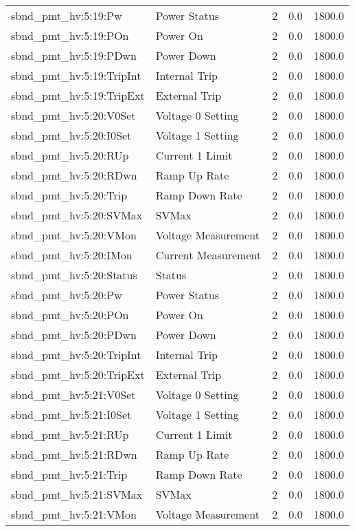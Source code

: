 \begin{center}
\begin{longtable}{l | l l l l }
sbnd\_pmt\_hv:5:19:Pw & Power Status & 2 & 0.0 & 1800.0\\ 
sbnd\_pmt\_hv:5:19:POn & Power On & 2 & 0.0 & 1800.0\\ 
sbnd\_pmt\_hv:5:19:PDwn & Power Down & 2 & 0.0 & 1800.0\\ 
sbnd\_pmt\_hv:5:19:TripInt & Internal Trip & 2 & 0.0 & 1800.0\\ 
sbnd\_pmt\_hv:5:19:TripExt & External Trip & 2 & 0.0 & 1800.0\\ 
sbnd\_pmt\_hv:5:20:V0Set & Voltage 0 Setting & 2 & 0.0 & 1800.0\\ 
sbnd\_pmt\_hv:5:20:I0Set & Voltage 1 Setting & 2 & 0.0 & 1800.0\\ 
sbnd\_pmt\_hv:5:20:RUp & Current 1 Limit & 2 & 0.0 & 1800.0\\ 
sbnd\_pmt\_hv:5:20:RDwn & Ramp Up Rate & 2 & 0.0 & 1800.0\\ 
sbnd\_pmt\_hv:5:20:Trip & Ramp Down Rate & 2 & 0.0 & 1800.0\\ 
sbnd\_pmt\_hv:5:20:SVMax & SVMax & 2 & 0.0 & 1800.0\\ 
sbnd\_pmt\_hv:5:20:VMon & Voltage Measurement & 2 & 0.0 & 1800.0\\ 
sbnd\_pmt\_hv:5:20:IMon & Current Measurement & 2 & 0.0 & 1800.0\\ 
sbnd\_pmt\_hv:5:20:Status & Status & 2 & 0.0 & 1800.0\\ 
sbnd\_pmt\_hv:5:20:Pw & Power Status & 2 & 0.0 & 1800.0\\ 
sbnd\_pmt\_hv:5:20:POn & Power On & 2 & 0.0 & 1800.0\\ 
sbnd\_pmt\_hv:5:20:PDwn & Power Down & 2 & 0.0 & 1800.0\\ 
sbnd\_pmt\_hv:5:20:TripInt & Internal Trip & 2 & 0.0 & 1800.0\\ 
sbnd\_pmt\_hv:5:20:TripExt & External Trip & 2 & 0.0 & 1800.0\\ 
sbnd\_pmt\_hv:5:21:V0Set & Voltage 0 Setting & 2 & 0.0 & 1800.0\\ 
sbnd\_pmt\_hv:5:21:I0Set & Voltage 1 Setting & 2 & 0.0 & 1800.0\\ 
sbnd\_pmt\_hv:5:21:RUp & Current 1 Limit & 2 & 0.0 & 1800.0\\ 
sbnd\_pmt\_hv:5:21:RDwn & Ramp Up Rate & 2 & 0.0 & 1800.0\\ 
sbnd\_pmt\_hv:5:21:Trip & Ramp Down Rate & 2 & 0.0 & 1800.0\\ 
sbnd\_pmt\_hv:5:21:SVMax & SVMax & 2 & 0.0 & 1800.0\\ 
sbnd\_pmt\_hv:5:21:VMon & Voltage Measurement & 2 & 0.0 & 1800.0\\ 

\end{longtable}
\end{center}
